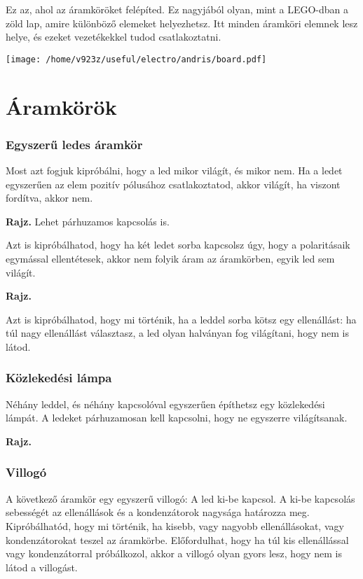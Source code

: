\documentclass[16pt]{scrreprt}
\begin{document}
Ez az, ahol az áramköröket felépíted. Ez nagyjából olyan, mint a LEGO-dban a zöld lap, amire különböző elemeket helyezhetsz. Itt minden áramköri elemnek lesz helye, és ezeket vezetékekkel tudod csatlakoztatni. 

\texttt{[image: /home/v923z/useful/electro/andris/board.pdf]}

\section{Áramkörök}

\subsubsection{Egyszerű ledes áramkör}

Most azt fogjuk kipróbálni, hogy a led mikor világít, és mikor nem. Ha a ledet egyszerűen az elem pozitív pólusához csatlakoztatod, akkor világít, ha viszont fordítva, akkor nem. 

\textbf{Rajz.} Lehet párhuzamos kapcsolás is.

Azt is kipróbálhatod, hogy ha két ledet sorba kapcsolsz úgy, hogy a polaritásaik egymással ellentétesek, akkor nem folyik áram az áramkörben, egyik led sem világít.

\textbf{Rajz.}

Azt is kipróbálhatod, hogy mi történik, ha a leddel sorba kötsz egy ellenállást: ha túl nagy ellenállást választasz, a led olyan halványan fog világítani, hogy nem is látod. 

\subsubsection{Közlekedési lámpa}

Néhány leddel, és néhány kapcsolóval egyszerűen építhetsz egy közlekedési lámpát. A ledeket párhuzamosan kell kapcsolni, hogy ne egyszerre világítsanak. 

\textbf{Rajz.}

\subsubsection{Villogó}

A következő áramkör egy egyszerű villogó: A led ki-be kapcsol. A ki-be kapcsolás sebességét az ellenállások és a kondenzátorok nagysága határozza meg. Kipróbálhatód, hogy mi történik, ha kisebb, vagy nagyobb ellenállásokat, vagy kondenzátorokat teszel az áramkörbe. Előfordulhat, hogy ha túl kis ellenállással vagy kondenzátorral próbálkozol, akkor a villogó olyan gyors lesz, hogy nem is látod a villogást.
\end{document}

